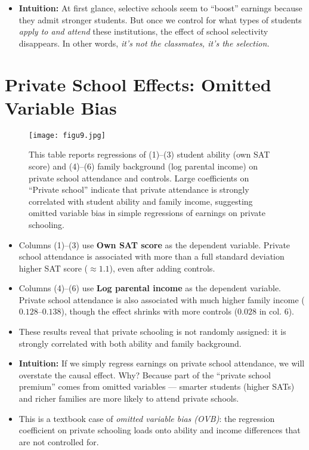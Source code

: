 \documentclass[12pt]{article}
\begin{document}
\begin{itemize}
    \item \textbf{Intuition:} At first glance, selective schools seem to “boost” earnings because they admit stronger students. But once we control for what types of students \textit{apply to and attend} these institutions, the effect of school selectivity disappears. In other words, \textit{it’s not the classmates, it’s the selection.}
\end{itemize}

\section*{\noindent\textbf{Private School Effects: Omitted Variable Bias}}

\begin{figure}[H]
    \centering
    \texttt{[image: figu9.jpg]} %
    \caption*{This table reports regressions of (1)--(3) student ability (own SAT score) 
    and (4)--(6) family background (log parental income) on private school attendance and controls. 
    Large coefficients on ``Private school'' indicate that private attendance is strongly correlated 
    with student ability and family income, suggesting omitted variable bias in simple regressions of earnings on private schooling.}
\end{figure}

\begin{itemize}
    \item Columns (1)--(3) use \textbf{Own SAT score} as the dependent variable. Private school attendance is associated with more than a full standard deviation higher SAT score ($\approx 1.1$), even after adding controls.  
    \item Columns (4)--(6) use \textbf{Log parental income} as the dependent variable. Private school attendance is also associated with much higher family income ($0.128$–$0.138$), though the effect shrinks with more controls ($0.028$ in col. 6).  
    \item These results reveal that private schooling is not randomly assigned: it is strongly correlated with both ability and family background.  
\end{itemize}

\begin{itemize}
    \item \textbf{Intuition:} If we simply regress earnings on private school attendance, we will overstate the causal effect. Why? Because part of the “private school premium” comes from omitted variables — smarter students (higher SATs) and richer families are more likely to attend private schools.  
    \item This is a textbook case of \textit{omitted variable bias (OVB)}: the regression coefficient on private schooling loads onto ability and income differences that are not controlled for.  
\end{itemize}
\end{document}
